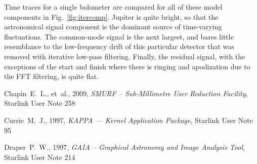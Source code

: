 \documentclass[twoside,11pt]{article}
\newcommand{\htmladdnormallink}[2]{#1}
\newcommand{\xref}[3]{#1}
\renewcommand{\_}{\texttt{\symbol{95}}}
\begin{document}
Time traces for a single bolometer are compared for all of these model
components in Fig.~\ref{fig:itercomp}. Jupiter is quite bright, so
that the astronomical signal component is the dominant source of
time-varying fluctuations. The common-mode signal is the next largest,
and bares little resemblance to the low-frequency drift of this
particular detector that was removed with iterative low-pass
filtering. Finally, the residual signal, with the exceptions of the
start and finish where there is ringing and apodization due to the FFT
filtering, is quite flat. 


\begin{thebibliography}{}



Chapin~E.~L., et~al., 2009, \textit{SMURF -- Sub-Millimetre User Reduction
Facility},
\xref{Starlink User Note 258}{sun2258}{} 



Currie~M.~J., 1997, {\it KAPPA --- Kernel Application Package},
\xref{Starlink User Note 95}{sun95}{}


Draper~P.~W., 1997, {\it GAIA -- Graphical Astronomy and Image 
Analysis Tool},
\xref{Starlink User Note 214}{sun214}{}







\end{thebibliography}
\end{document}
